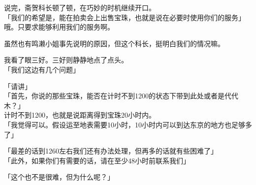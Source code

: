说完，斋贺科长顿了顿，在巧妙的时机继续开口。\\

「我们的希望是，能在拍卖会上出售宝珠，也就是说在必要时使用你们的服务」\\

哦。只要求能够利用我们的服务啊。

虽然也有鸣濑小姐事先说明的原因，但这个科长，挺明白我们的情况嘛。

我看了眼三好。三好则静静地点了点头。\\

「我们这边有几个问题」

「请讲」\\

「首先，你说的那些宝珠，能否在计时不到1200的状态下带到此处或者是代代木？」\\

计时不到1200，也就是说距离得到宝珠20小时内。\\

「我觉得可以。假设运至地表需要10小时，10小时内可以到达东京的地方也足够多了」

「最差的话到1260左右我们还有办法处理，但再多的话就有些困难了」\\

「此外，如果你们有需要的话，请在至少48小时前联系我们」

「这个也不是很难，但为什么呢？」\\


